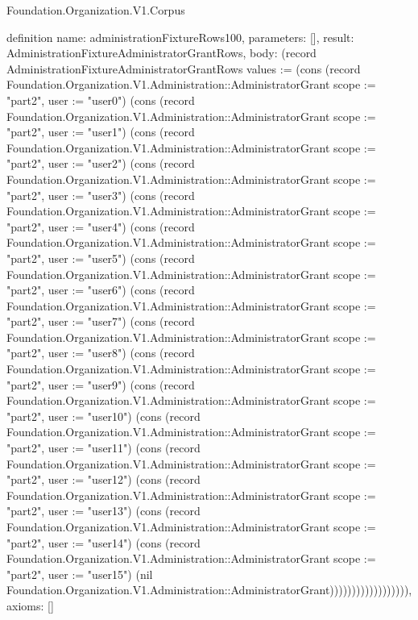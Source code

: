 \begin{lexlean}{Foundation.Organization.V1.Corpus}
\begin{semanticmodule}
definition{
  name: administrationFixtureRows100,
  parameters: [],
  result: AdministrationFixtureAdministratorGrantRows,
  body: (record AdministrationFixtureAdministratorGrantRows {values := (cons (record Foundation.Organization.V1.Administration::AdministratorGrant {scope := "part2", user := "user0"}) (cons (record Foundation.Organization.V1.Administration::AdministratorGrant {scope := "part2", user := "user1"}) (cons (record Foundation.Organization.V1.Administration::AdministratorGrant {scope := "part2", user := "user2"}) (cons (record Foundation.Organization.V1.Administration::AdministratorGrant {scope := "part2", user := "user3"}) (cons (record Foundation.Organization.V1.Administration::AdministratorGrant {scope := "part2", user := "user4"}) (cons (record Foundation.Organization.V1.Administration::AdministratorGrant {scope := "part2", user := "user5"}) (cons (record Foundation.Organization.V1.Administration::AdministratorGrant {scope := "part2", user := "user6"}) (cons (record Foundation.Organization.V1.Administration::AdministratorGrant {scope := "part2", user := "user7"}) (cons (record Foundation.Organization.V1.Administration::AdministratorGrant {scope := "part2", user := "user8"}) (cons (record Foundation.Organization.V1.Administration::AdministratorGrant {scope := "part2", user := "user9"}) (cons (record Foundation.Organization.V1.Administration::AdministratorGrant {scope := "part2", user := "user10"}) (cons (record Foundation.Organization.V1.Administration::AdministratorGrant {scope := "part2", user := "user11"}) (cons (record Foundation.Organization.V1.Administration::AdministratorGrant {scope := "part2", user := "user12"}) (cons (record Foundation.Organization.V1.Administration::AdministratorGrant {scope := "part2", user := "user13"}) (cons (record Foundation.Organization.V1.Administration::AdministratorGrant {scope := "part2", user := "user14"}) (cons (record Foundation.Organization.V1.Administration::AdministratorGrant {scope := "part2", user := "user15"}) (nil Foundation.Organization.V1.Administration::AdministratorGrant)))))))))))))))))}),
  axioms: []
}


\end{semanticmodule}
\end{lexlean}
